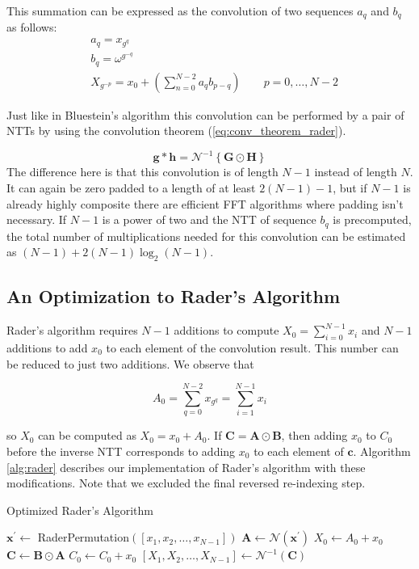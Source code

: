 \documentclass[english,master=eelt,masteroption=ec]{kulemt}
\begin{document}
This summation can be expressed as the convolution of two sequences $a_q$ and $b_q$ as follows:
\begin{equation}
\begin{split}
& a_q = x_{g^q} \\
& b_q = \omega^{g^{-q}} \\
& X_{g^{-p}} = x_0 + \left(\sum_{n=0}^{N-2} a_q b_{p-q} \right) \qquad p=0,\ldots,N-2
\end{split}
\end{equation}

Just like in Bluestein's algorithm this convolution can be performed by a pair of NTTs by using the convolution theorem (\ref{eq:conv_theorem_rader}).

\begin{equation}
\label{eq:conv_theorem_rader}
\mathbf{g} \ast \mathbf{h} = \mathcal{N}^{-1}\left\{\mathbf{G}\odot \mathbf{H}\right\}
\end{equation}
The difference here is that this convolution is of length $N-1$ instead of length $N$. It can again be zero padded to a length of at least $2(N-1)-1$, but if $N-1$ is already highly composite there are efficient FFT algorithms where padding isn't necessary. If $N-1$ is a power of two and the NTT of sequence $b_q$ is precomputed, the total number of multiplications needed for this convolution can be estimated as $\left(N-1\right) + 2 \left(N-1\right)\log_2 \left(N-1\right)$.

\subsection{An Optimization to Rader's Algorithm}
Rader's algorithm requires $N-1$ additions to compute $X_0 = \sum_{i=0}^{N-1} x_i$ and $N-1$ additions to add $x_0$ to each element of the convolution result. This number can be reduced to just two additions. We observe that

\begin{equation}
A_0 = \sum_{q=0}^{N-2} x_{g^q} = \sum_{i=1}^{N-1} x_i
\end{equation}

so $X_0$ can be computed as $X_0 = x_0 + A_0$. If $\mathbf{C} = \mathbf{A} \odot \mathbf{B}$, then adding $x_0$ to $C_0$ before the inverse NTT corresponds to adding $x_0$ to each element of $\mathbf{c}$. Algorithm \ref{alg:rader} describes our implementation of Rader's algorithm with these modifications. Note that we excluded the final reversed re-indexing step.

\begin{algorithm}
\caption{Optimized Rader's Algorithm}\label{alg:rader}
$\mathbf{x^\prime} \gets$ RaderPermutation$([x_1, x_2,\ldots, x_{N-1}])$\;
$\mathbf{A} \gets \mathcal{N}(\mathbf{x^\prime})$\;
$X_0 \gets A_0 + x_0$\;
$\mathbf{C} \gets \mathbf{B} \odot \mathbf{A}$\;
$C_0 \gets C_0 + x_0$\;
$[X_1, X_2,\ldots, X_{N-1}] \gets \mathcal{N}^{-1}\left(\mathbf{C}\right)$\;
\end{algorithm}
\end{document}
